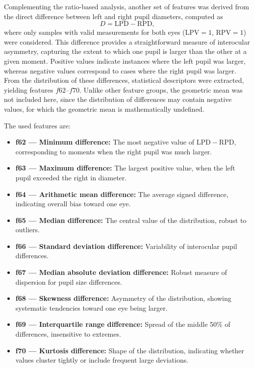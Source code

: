 \documentclass{article}
\begin{document}
Complementing the ratio-based analysis, another set of features was derived from the direct difference between left and right pupil diameters, computed as
\[
D = \mathrm{LPD} - \mathrm{RPD},
\]
where only samples with valid measurements for both eyes (\(\mathrm{LPV} = 1\), \(\mathrm{RPV} = 1\)) were considered.  
This difference provides a straightforward measure of interocular asymmetry, capturing the extent to which one pupil is larger than the other at a given moment. 
Positive values indicate instances where the left pupil was larger, whereas negative values correspond to cases where the right pupil was larger.
From the distribution of these differences, statistical descriptors were extracted, yielding features \(f62\)--\(f70\). 
Unlike other feature groups, the geometric mean was not included here, since the distribution of differences may contain negative values, for which the geometric mean is mathematically undefined.  

The used features are:

\begin{itemize}
    \item \textbf{f62 — Minimum difference:} The most negative value of \(\mathrm{LPD} - \mathrm{RPD}\), corresponding to moments when the right pupil was much larger.
    \item \textbf{f63 — Maximum difference:} The largest positive value, when the left pupil exceeded the right in diameter.
    \item \textbf{f64 — Arithmetic mean difference:} The average signed difference, indicating overall bias toward one eye.
    \item \textbf{f65 — Median difference:} The central value of the distribution, robust to outliers.
    \item \textbf{f66 — Standard deviation difference:} Variability of interocular pupil differences.
    \item \textbf{f67 — Median absolute deviation difference:} Robust measure of dispersion for pupil size differences.
    \item \textbf{f68 — Skewness difference:} Asymmetry of the distribution, showing systematic tendencies toward one eye being larger.
    \item \textbf{f69 — Interquartile range difference:} Spread of the middle 50\% of differences, insensitive to extremes.
    \item \textbf{f70 — Kurtosis difference:} Shape of the distribution, indicating whether values cluster tightly or include frequent large deviations.
\end{itemize}
\end{document}
